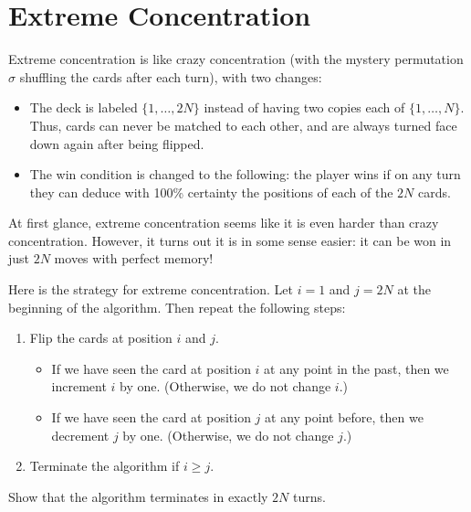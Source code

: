 \documentclass[10pt]{article}
\newif\ifpaper
\begin{document}
\ifpaper
\begin{tcolorbox}
We know that after $(2N)!$ applications of $\sigma$, all the cards return to their original position. Therefore, we can just play our normal concentration strategy on turns that are divisible by $(2N)!$, and play arbitrarily on any other turn.
\end{tcolorbox}
\fi


\section{Extreme Concentration}
Extreme concentration is like crazy concentration
(with the mystery permutation $\sigma$ shuffling the cards
after each turn),
with two changes:
\begin{itemize}
    \item The deck is labeled $\{1, \dots, 2N\}$ instead
    of having two copies each of $\{1, \dots, N\}$.
    Thus, cards can never be matched to each other,
    and are always turned face down again after being flipped.
    \item The win condition is changed to the following:
    the player wins if on any turn they can deduce with 100\% certainty
    the positions of each of the $2N$ cards.
\end{itemize}
At first glance, extreme concentration seems like it is even
harder than crazy concentration.
However, it turns out it is in some sense easier:
it can be won in just $2N$ moves with perfect memory!

Here is the strategy for extreme concentration.
Let $i=1$ and $j=2N$ at the beginning of the algorithm.
Then repeat the following steps:
\begin{enumerate}
    \item Flip the cards at position $i$ and $j$.
    \begin{itemize}
        \item If we have seen the card at position $i$ at any point in the past,
        then we increment $i$ by one.
        (Otherwise, we do not change $i$.)
        \item If we have seen the card at position $j$ at any point before,
        then we decrement $j$ by one.
        (Otherwise, we do not change $j$.)
    \end{itemize}
    \item Terminate the algorithm if $i \ge j$.
\end{enumerate}

\begin{problem}
    [8 points]
    Show that the algorithm terminates in exactly $2N$ turns.
\end{problem}
\end{document}
